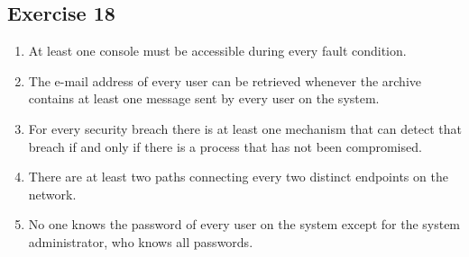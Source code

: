 \documentclass{article}
\begin{document}
\subsection*{Exercise 18}
\begin{enumerate} [label = (\alph*)]
    \item At least one console must be accessible during every fault condition.
    \item The e-mail address of every user can be retrieved whenever the archive contains at least one message sent by every user on the system.
    \item For every security breach there is at least one mechanism that can detect that breach if and only if there is a process that has not been compromised.
    \item There are at least two paths connecting every two distinct endpoints on the network.
    \item No one knows the password of every user on the system except for the system administrator, who knows all passwords.
\end{enumerate}
\end{document}
